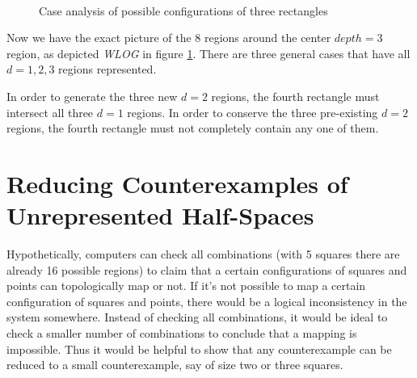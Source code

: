 \documentclass{NSF}
\begin{document}
\begin{figure}[ht]
\centering
{}
 \\
\caption{Case analysis of possible configurations of three rectangles}
\label{fig:depth-map}
\end{figure}

Now we have the exact picture of the 8 regions around the center $depth=3$ region, as depicted \textit{WLOG} in figure \ref{fig:depth-map}.  There are three general cases that have all $d=1,2,3$ regions represented. 

In order to generate the three new $d=2$ regions, the fourth rectangle must intersect all three $d=1$ regions. In order to conserve the three pre-existing $d=2$ regions, the fourth rectangle must not completely contain any one of them. 





\section{Reducing Counterexamples of Unrepresented Half-Spaces}
Hypothetically, computers can check all combinations (with 5 squares there are already 16 possible regions) to claim that a certain configurations of squares and points can topologically map or not. If it's not possible to map a certain configuration of squares and points, there would be a logical inconsistency in the system somewhere. Instead of checking all combinations, it would be ideal to check a smaller number of combinations  to conclude that a mapping is impossible. Thus it would be helpful to show that any counterexample can be reduced to a small counterexample, say of size two or three squares.
\end{document}
